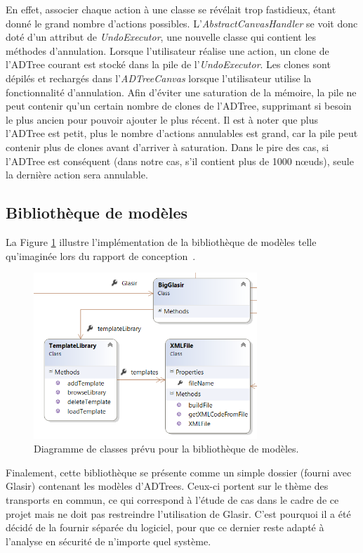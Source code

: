         En effet, associer chaque action à une classe se révélait trop fastidieux, étant donné le grand nombre d'actions possibles. L'\emph{AbstractCanvasHandler} se voit donc doté d'un attribut de \emph{UndoExecutor}, une nouvelle classe qui contient les méthodes d'annulation. Lorsque l'utilisateur réalise une action, un clone de l'ADTree courant est stocké dans la pile de l'\emph{UndoExecutor}. Les clones sont dépilés et rechargés dans l'\emph{ADTreeCanvas} lorsque l'utilisateur utilise la fonctionnalité d'annulation. Afin d'éviter une saturation de la mémoire, la pile ne peut contenir qu'un certain nombre de clones de l'ADTree, supprimant si besoin le plus ancien pour pouvoir ajouter le plus récent. Il est à noter que plus l'ADTree est petit, plus le nombre d'actions annulables est grand, car la pile peut contenir plus de clones avant d'arriver à saturation. Dans le pire des cas, si l'ADTree est conséquent (dans notre cas, s'il contient plus de 1000 n\oe{}uds), seule la dernière action sera annulable. 

	\subsection{Bibliothèque de modèles}
    \label{ssec:bib}
		La {\sc Figure} \ref{fig:library} illustre l'implémentation de la bibliothèque de modèles telle qu'imaginée lors du rapport de conception~\cite{conception}. 
		
		\begin{figure}[H]
            \centering
                \includegraphics[width=0.75\textwidth]{figure/library.png}
            \caption{Diagramme de classes prévu pour la bibliothèque de modèles.}
            \label{fig:library}
        \end{figure}

        Finalement, cette bibliothèque se présente comme un simple dossier (fourni avec Glasir) contenant les modèles d'ADTrees. Ceux-ci portent sur le thème des transports en commun, ce qui correspond à l'étude de cas dans le cadre de ce projet mais ne doit pas restreindre l'utilisation de Glasir. C'est pourquoi il a été décidé de la fournir séparée du logiciel, pour que ce dernier reste adapté à l'analyse en sécurité de n'importe quel système.